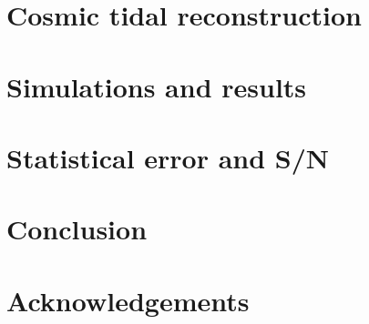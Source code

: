 \documentclass[aps,prd,twocolumn,showpacs,superscriptaddress,groupedaddress,nofootinbib]{revtex4}  %
\begin{document}
\section{Cosmic tidal reconstruction}

\section{Simulations and results}

%
%
\section{Statistical error and S/N}
\label{sec:sn}

\section{Conclusion}

\section{Acknowledgements}

%


\end{document}
